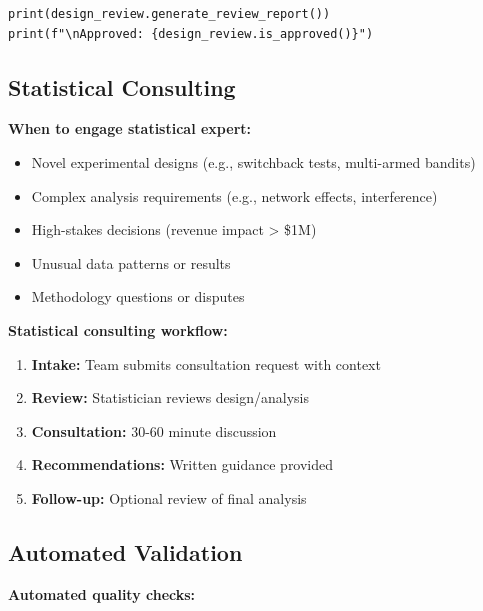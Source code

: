 \begin{lstlisting}
print(design_review.generate_review_report())
print(f"\nApproved: {design_review.is_approved()}")
\end{lstlisting}

\subsection{Statistical Consulting}

\textbf{When to engage statistical expert:}

\begin{itemize}
    \item Novel experimental designs (e.g., switchback tests, multi-armed bandits)
    \item Complex analysis requirements (e.g., network effects, interference)
    \item High-stakes decisions (revenue impact > \$1M)
    \item Unusual data patterns or results
    \item Methodology questions or disputes
\end{itemize}

\textbf{Statistical consulting workflow:}

\begin{enumerate}
    \item \textbf{Intake:} Team submits consultation request with context
    \item \textbf{Review:} Statistician reviews design/analysis
    \item \textbf{Consultation:} 30-60 minute discussion
    \item \textbf{Recommendations:} Written guidance provided
    \item \textbf{Follow-up:} Optional review of final analysis
\end{enumerate}

\subsection{Automated Validation}

\textbf{Automated quality checks:}

